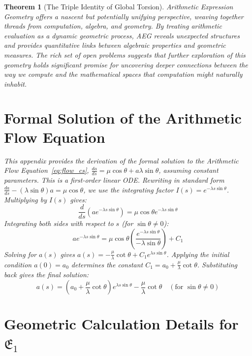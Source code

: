 \documentclass[12pt]{article}
\newtheorem{theorem}{Theorem}[section]
\begin{document}
\begin{theorem}[The Triple Identity of Global Torsion]
Arithmetic Expression Geometry offers a nascent but potentially unifying perspective, weaving together threads from computation, algebra, and geometry. By treating arithmetic evaluation as a dynamic geometric process, AEG reveals unexpected structures and provides quantitative links between algebraic properties and geometric measures. The rich set of open problems suggests that further exploration of this geometry holds significant promise for uncovering deeper connections between the way we compute and the mathematical spaces that computation might naturally inhabit.

\newpage
\appendix

\section{Formal Solution of the Arithmetic Flow Equation}\label{app:flow_solution}

This appendix provides the derivation of the formal solution to the Arithmetic Flow Equation~\eqref{eq:flow_cs}, \( \frac{da}{ds} = \mu \cos \theta + a \lambda \sin \theta \), assuming constant parameters. This is a first-order linear ODE. Rewriting in standard form \( \frac{da}{ds} - (\lambda \sin \theta) a = \mu \cos \theta \), we use the integrating factor \( I(s) = e^{-\lambda s \sin \theta} \).
Multiplying by \( I(s) \) gives:
\[
\frac{d}{ds}\left( a e^{-\lambda s \sin \theta} \right) = \mu \cos \theta e^{-\lambda s \sin \theta}
\]
Integrating both sides with respect to \( s \) (for \( \sin \theta \neq 0 \)):
\[
a e^{-\lambda s \sin \theta} = \mu \cos \theta \left( \frac{e^{-\lambda s \sin \theta}}{-\lambda \sin \theta} \right) + C_1
\]
Solving for \( a(s) \) gives \( a(s) = -\frac{\mu}{\lambda} \cot \theta + C_1 e^{\lambda s \sin \theta} \). Applying the initial condition \( a(0) = a_0 \) determines the constant \( C_1 = a_0 + \frac{\mu}{\lambda} \cot \theta \). Substituting back gives the final solution:
\begin{equation}
   a(s) = \left(a_0 + \frac{\mu}{\lambda} \cot \theta\right) e^{\lambda s \sin \theta} - \frac{\mu}{\lambda} \cot \theta \quad (\text{for } \sin \theta \neq 0) \label{eq:solution_appendix_cs}
\end{equation}

\section{Geometric Calculation Details for \( \mathfrak{E}_1 \)}\label{app:geometry_calc}


\end{theorem}
\end{document}
